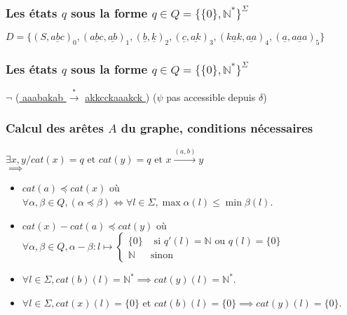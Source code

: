 \documentclass[12pt]{beamer}
\begin{document}
\begin{frame}\frametitle{Les états $q$ sous la forme $q \in Q = \{\{0\},\mathbb{N}^*\}^{\Sigma}$}

$D = \{(S,\underline{ abc })_0,(\underline{ abc },\underline{ ab })_1,(\underline{ b },\underline{ k })_2,(\underline{ c },\underline{ ak })_3,(\underline{ kak },\underline{ aa })_4,(\underline{ a },\underline{ aaa })_5\}$

\begin{figure}
    \centering
    \qquad
\end{figure}

\end{frame}

\begin{frame}\frametitle{Les états $q$ sous la forme $q \in Q = \{\{0\},\mathbb{N}^*\}^{\Sigma}$}


$\neg$ (\underline{ aaabakab } $\overset{*}{\rightarrow}$ \underline{ akkcckaaakck }) ($\psi$ pas accessible depuis $\delta$)

\end{frame}

\begin{frame}\frametitle{Calcul des arêtes $A$ du graphe, conditions nécessaires}
$\exists x,y / cat(x) = q \text{ et } cat(y) = q \text { et } x \overset{(a,b)}{\rightarrow} y$\\
$\implies$
\begin{itemize}
\item $cat(a) \preceq cat(x)$ où\\ $\forall \alpha, \beta \in Q, (\alpha \preceq \beta) \iff \forall l \in \Sigma, \max \alpha(l) \leq \min \beta(l)$.
\pause

\item $cat(x)-cat(a) \preceq cat(y)$ où\\ $\forall \alpha,\beta \in Q, \alpha-\beta : l \mapsto 
\begin{cases}
\{0\} & \text { si } q'(l) = \mathbb{N} \text{ ou }q(l) = \{0\}\\
\mathbb{N} & \text{sinon}
\end{cases}
$
\pause

\item $\forall l \in \Sigma, cat(b)(l) = \mathbb{N}^* \implies cat(y)(l) = \mathbb{N}^*$. 
\pause

\item $\forall l \in \Sigma, cat(x)(l) = \{0\}$ et $cat(b)(l) = \{0\} \implies cat(y)(l) = \{0\}$.

\end{itemize}

\end{frame}
\end{document}
